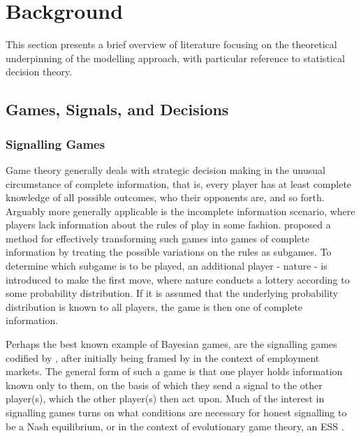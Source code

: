 \section{Background}

\label{sec:lit_review}

This section presents a brief overview of literature focusing on the theoretical underpinning of the modelling
approach, with particular reference to statistical decision theory.


\subsection{Games, Signals, and Decisions}
\label{sub:games_signals}




\subsubsection{Signalling Games}



Game theory generally deals with strategic decision making in the
unusual circumstance of complete information, that is, every player
has at least complete knowledge of all possible outcomes, who their
opponents are, and so forth. Arguably more generally applicable is
the incomplete information scenario, where players lack information
about the rules of play in some fashion. \citet{Harsanyi1967} proposed
a method for effectively transforming such games into games of complete
information by treating the possible variations on the rules as subgames.
To determine which subgame is to be played, an additional player -
nature - is introduced to make the first move, where nature conducts
a lottery according to some probability distribution. If it is assumed
that the underlying probability distribution is known to all players,
the game is then one of complete information. 

Perhaps the best known example of Bayesian games, are the signalling
games codified by \citet{Kreps1987}, after initially being framed
by \citet{Spence1973} in the context of employment markets. The general
form of such a game is that one player holds information known only
to them, on the basis of which they send a signal to the other player(s),
which the other player(s) then act upon. Much of the interest in signalling
games turns on what conditions are necessary for honest signalling
to be a Nash equilibrium, or in the context of evolutionary game theory,
an \ac{ESS} . 

